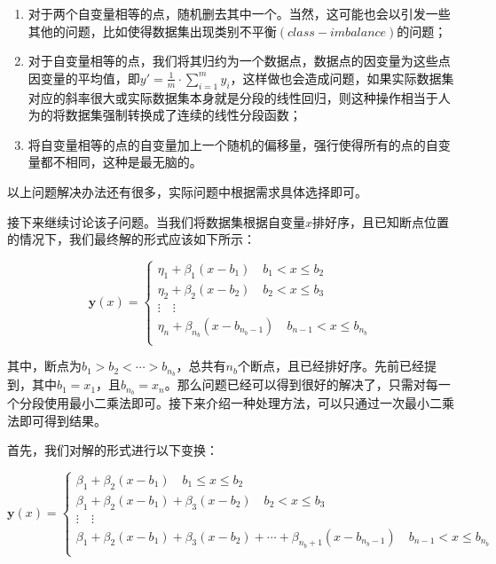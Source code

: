 \begin{enumerate}[\quad ·]
    \item 对于两个自变量相等的点，随机删去其中一个。当然，这可能也会以引发一些其他的问题，比如使得数据集出现类别不平衡$(class-imbalance)$的问题；
    \item 对于自变量相等的点，我们将其归约为一个数据点，数据点的因变量为这些点因变量的平均值，即$y' = \frac{1}{m} \cdot \sum _{i=1}^{m} y_i$，这样做也会造成问题，如果实际数据集对应的斜率很大或实际数据集本身就是分段的线性回归，则这种操作相当于人为的将数据集强制转换成了连续的线性分段函数；
    \item 将自变量相等的点的自变量加上一个随机的偏移量，强行使得所有的点的自变量都不相同，这种是最无脑的。
\end{enumerate}

以上问题解决办法还有很多，实际问题中根据需求具体选择即可。

接下来继续讨论该子问题。当我们将数据集根据自变量$x$排好序，且已知断点位置的情况下，我们最终解的形式应该如下所示\cite{ref8}：

\[\mathbf{y}(x) = \begin{cases}
    \eta _1 + \beta _1(x-b_1) \quad b_1 < x \leq b_2 \\
    \eta _2 + \beta _2(x-b_2) \quad b_2 < x \leq b_3 \\
    \vdots \quad \vdots \\
    \eta_n + \beta_{n_b}(x-b_{n_b-1}) \quad b_{n-1} < x \leq b_{n_b} \\
\end{cases}\]

其中，断点为$b_1 > b_2 < \cdots > b_{n_b}$，总共有$n_b$个断点，且已经排好序。先前已经提到，其中$b_1 = x_1$，且$b_{n_b} = x_n$。那么问题已经可以得到很好的解决了，只需对每一个分段使用最小二乘法即可。接下来介绍一种处理方法，可以只通过一次最小二乘法即可得到结果。

首先，我们对解的形式进行以下变换：

\[\mathbf{y}(x) = \begin{cases}
    \beta_1 + \beta_2(x-b_1) \quad b_1 \leq x \leq b_2 \\
    \beta_1 + \beta_2(x-b_1) + \beta_3(x-b_2) \quad b_2 < x \leq b_3 \\
    \vdots \quad \vdots \\
    \beta_1 + \beta_2(x-b_1) + \beta_3(x-b_2) + \cdots + \beta_{n_b+1}(x-b_{n_b-1}) \quad b_{n-1} < x \leq b_{n_b} \\
\end{cases}\]

